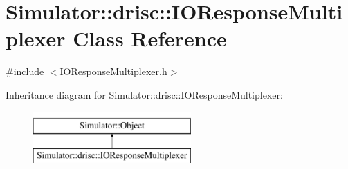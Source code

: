 \hypertarget{class_simulator_1_1drisc_1_1_i_o_response_multiplexer}{\section{Simulator\+:\+:drisc\+:\+:I\+O\+Response\+Multiplexer Class Reference}
\label{class_simulator_1_1drisc_1_1_i_o_response_multiplexer}
}


{\ttfamily \#include $<$I\+O\+Response\+Multiplexer.\+h$>$}

Inheritance diagram for Simulator\+:\+:drisc\+:\+:I\+O\+Response\+Multiplexer\+:\begin{figure}[H]
\begin{center}
\leavevmode
\includegraphics[height=2.000000cm]{class_simulator_1_1drisc_1_1_i_o_response_multiplexer}
\end{center}
\end{figure}
